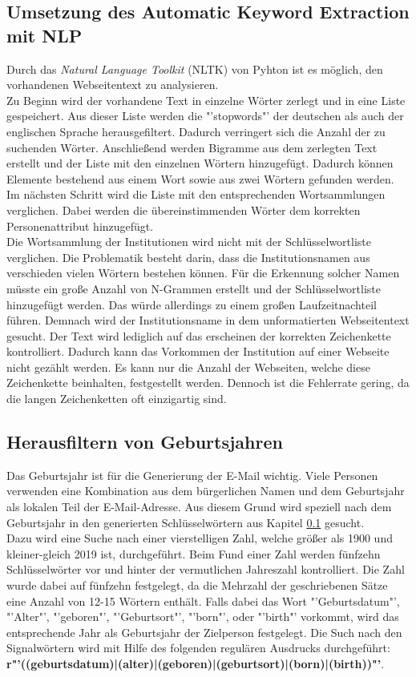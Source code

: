 	\subsection{Umsetzung des Automatic Keyword Extraction mit NLP}
		\label{subsec:AutomaticKeywordExtractionNLP}
		Durch das \textit{Natural Language Toolkit} (NLTK) von Pyhton ist es möglich, den vorhandenen Webseitentext zu analysieren.\\
		Zu Beginn wird der vorhandene Text in einzelne Wörter zerlegt und in eine Liste gespeichert. Aus dieser Liste werden die "'stopwords"' der deutschen als auch der englischen Sprache herausgefiltert. Dadurch verringert sich die Anzahl der zu suchenden Wörter. Anschließend werden Bigramme aus dem zerlegten Text erstellt und der Liste mit den einzelnen Wörtern hinzugefügt. Dadurch können Elemente bestehend aus einem Wort sowie aus zwei Wörtern gefunden werden.\\
		Im nächsten Schritt wird die Liste mit den entsprechenden Wortsammlungen verglichen. Dabei werden die übereinstimmenden Wörter dem korrekten Personenattribut hinzugefügt.\\
		Die Wortsammlung der Institutionen wird nicht mit der Schlüsselwortliste verglichen. Die Problematik besteht darin, dass die Institutionsnamen aus verschieden vielen Wörtern bestehen können. Für die Erkennung solcher Namen müsste ein große Anzahl von N-Grammen erstellt und der Schlüsselwortliste hinzugefügt werden. Das würde allerdings zu einem großen Laufzeitnachteil führen. Demnach wird der Institutionsname in dem unformatierten Webseitentext gesucht. Der Text wird lediglich auf das erscheinen der korrekten Zeichenkette kontrolliert. Dadurch kann das Vorkommen der Institution auf einer Webseite nicht gezählt werden. Es kann nur die Anzahl der Webseiten, welche diese Zeichenkette beinhalten, festgestellt werden. Dennoch ist die Fehlerrate gering, da die langen Zeichenketten oft einzigartig sind.
		

	\subsection{Herausfiltern von Geburtsjahren}
		Das Geburtsjahr ist für die Generierung der E-Mail wichtig. Viele Personen verwenden eine Kombination aus dem bürgerlichen Namen und dem Geburtsjahr als lokalen Teil der E-Mail-Adresse. Aus diesem Grund wird speziell nach dem Geburtsjahr in den generierten Schlüsselwörtern aus Kapitel \ref{subsec:AutomaticKeywordExtractionNLP} gesucht.\\
		Dazu wird eine Suche nach einer vierstelligen Zahl, welche größer als 1900 und kleiner-gleich 2019 ist, durchgeführt. Beim Fund einer Zahl werden  fünfzehn Schlüsselwörter vor und hinter der vermutlichen Jahreszahl kontrolliert. Die Zahl wurde dabei auf fünfzehn festgelegt, da die Mehrzahl der geschriebenen Sätze eine Anzahl von 12-15 Wörtern enthält. \cite{seibicke1969schreibt} Falls dabei das Wort "'Geburtsdatum"', "'Alter"', "'geboren"', "'Geburtsort"', "'born"', oder "'birth"' vorkommt, wird das entsprechende Jahr als Geburtsjahr der Zielperson festgelegt. Die Such nach den Signalwörtern wird mit Hilfe des folgenden regulären Ausdrucks durchgeführt:
		\textbf{r"'((geburtsdatum)|(alter)|(geboren)|(geburtsort)|(born)|(birth))"'}.
		
